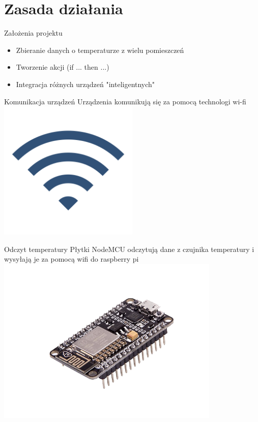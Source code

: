 \section{Zasada działania}
    
    \frame{\sectionpage}
    
    \begin{frame}{Założenia projektu}
        \begin{itemize}
            \item Zbieranie danych o temperaturze z wielu pomieszczeń
            \item Tworzenie akcji (if ... then ...)
            \item Integracja różnych urządzeń "inteligentnych"
        \end{itemize}
    \end{frame}
    
    \begin{frame}{Komunikacja urządzeń}
        \centering
        Urządzenia komunikują się za pomocą technologi wi-fi
        \includegraphics[width = 0.5\textwidth]{images/3wifi.png}

    \end{frame}
    
    \begin{frame}{Odczyt temperatury}
        \centering
        Płytki NodeMCU odczytują dane z czujnika temperatury i wysyłają je za pomocą wifi do raspberry pi
        \includegraphics[width = 0.8\textwidth]{images/4no.png}
    \end{frame}
    
